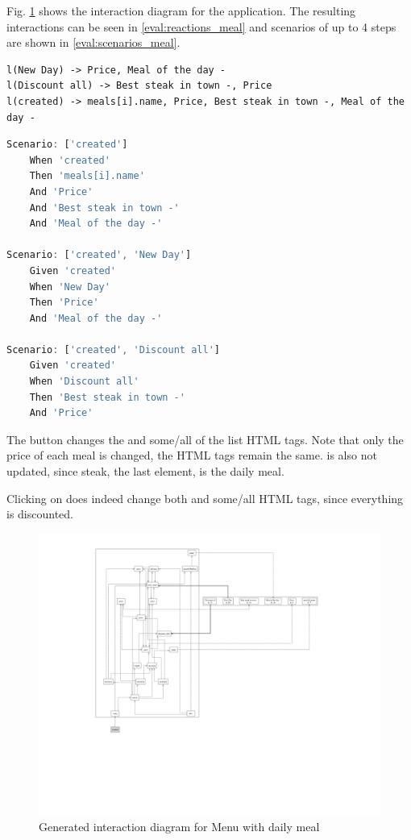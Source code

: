 Fig. \ref{fig:diagram_meal_list_properties} shows the interaction diagram for the application. The resulting interactions can be seen in \ref{eval:reactions_meal} and scenarios of up to 4 steps are shown in \ref{eval:scenarios_meal}.
\label{eval:reactions_meal}
\begin{lstlisting}[language=JavaScriptPlain]
l(New Day) -> Price, Meal of the day -
l(Discount all) -> Best steak in town -, Price
l(created) -> meals[i].name, Price, Best steak in town -, Meal of the day -
\end{lstlisting}

\label{eval:scenarios_meal}
\begin{lstlisting}[language=JavaScript,   basicstyle=\fontsize{9}{9}\selectfont\ttfamily]
Scenario: ['created']
	When 'created'
	Then 'meals[i].name'
	And 'Price'
	And 'Best steak in town -'
	And 'Meal of the day -'

Scenario: ['created', 'New Day']
	Given 'created'
	When 'New Day'
	Then 'Price'
	And 'Meal of the day -'

Scenario: ['created', 'Discount all']
	Given 'created'
	When 'Discount all'
	Then 'Best steak in town -'
	And 'Price'
\end{lstlisting}

The  button changes the  and some/all of the  list HTML tags. Note that only the price of each meal is changed, the  HTML tags remain the same.  is also not updated, since steak, the last element, is the daily meal. 

Clicking on  does indeed change both  and some/all  HTML tags, since everything is discounted.

\newpage
\begin{figure}[H]
    \centering
    \includegraphics[width=\textwidth]{images/diagram_meal.png}
     \caption{Generated interaction diagram for Menu with daily meal}
     \label{fig:diagram_meal_list_properties}
\end{figure}
